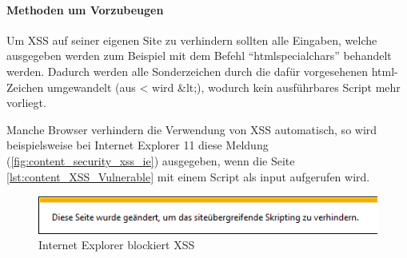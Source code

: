 \paragraph{Methoden um Vorzubeugen}

Um XSS auf seiner eigenen Site zu verhindern sollten alle Eingaben, welche ausgegeben werden zum Beispiel mit dem Befehl \enquote{htmlspecialchars} behandelt werden. Dadurch werden alle Sonderzeichen durch die dafür vorgesehenen html-Zeichen umgewandelt (aus < wird \&lt;), wodurch kein ausführbares Script mehr vorliegt.

Manche Browser verhindern die Verwendung von XSS automatisch, so wird beispielsweise bei Internet Explorer 11 diese Meldung (\autoref{fig:content_security_xss_ie}) ausgegeben, wenn die Seite \autoref{lst:content_XSS_Vulnerable} mit einem Script als input aufgerufen wird.

\begin{figure}[H]
\centering
\includegraphics[keepaspectratio=true, width=14cm]{images/screenshots/xss_ie.png}
\caption{Internet Explorer blockiert XSS}
\label{fig:content_security_xss_ie}
\end{figure}
